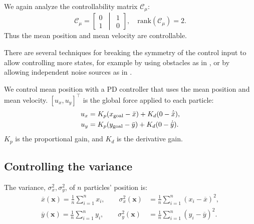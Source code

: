 We again analyze the controllability matrix $\mathcal{C}_{\mu}$:
\begin{equation}
\mathcal{C}_\mu=\left[ \begin{matrix} 
0\\
1
\end{matrix}
\,\middle\vert\,
 \begin{matrix} 
1\\
0
\end{matrix}
 \right],  \quad \textrm{rank}(\mathcal{C}_\mu)=2.
\end{equation}
Thus the mean position and mean velocity are controllable.


There are several techniques for breaking the symmetry of the control input to allow controlling more states, for example by using obstacles as in \cite{Becker2013b}, or by allowing independent noise sources as in \cite{beckerIJRR2014}.

We control mean position with a PD controller that uses the mean position and mean velocity. $[u_x,u_y]^\top$ is the global force applied to each particle:
\begin{align}
u_x &= K_{p}(x_{\rm{goal}} - \bar{x}) + K_{d}(0-\dot{\bar{x}}), \nonumber\\
u_y &= K_{p}(y_{\rm{goal}}  - \bar{y}) + K_{d}(0-\dot{\bar{y}}).  \label{eq:PDcontrolPosition}
\end{align}
 $K_{p}$ is the proportional gain, and $K_{d}$ is the derivative gain. 


\subsection{Controlling the variance}\label{sec:VarianceControl}

The variance, $\sigma_x^2,\sigma_y^2$, of $n$ particles' position is:
\begin{align}\label{eq:meanVar}
 \overline{x}(\mathbf{x}) = \frac{1}{n} \sum_{i=1}^n x_{i}, \qquad  %
\sigma_x^2(\mathbf{x}) &= \frac{1}{n} \sum_{i=1}^n (x_{i} - \overline{x})^2,  \nonumber \\ 
 \overline{y}(\mathbf{x}) = \frac{1}{n} \sum_{i=1}^n y_{i}, \qquad  %
\sigma_y^2(\mathbf{x}) &= \frac{1}{n} \sum_{i=1}^n (y_{i} - \overline{y})^2.  
\end{align}

